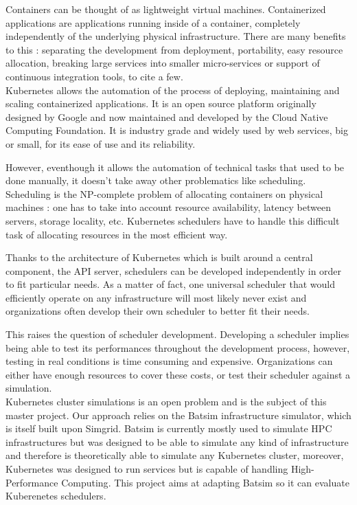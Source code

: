 \documentclass[12pt]{report}
\begin{document}
Containers can be thought of as lightweight virtual machines.  Containerized
applications are applications running inside of a container, completely
independently of the underlying physical infrastructure. There are many
benefits to this : separating the development from deployment,
portability, easy resource allocation, breaking large services into smaller
micro-services or support of continuous integration tools, to cite a few.\\

Kubernetes\cite{kubernetes} allows the automation of the process of deploying, maintaining and
scaling containerized applications. It is an open source platform originally
designed by Google and now maintained and developed by the Cloud Native
Computing Foundation. It is industry grade and widely used by web services, big
or small, for its ease of use and its reliability.

However, eventhough it allows the automation of technical tasks that used to be
done manually, it doesn't take away other problematics like scheduling.
Scheduling is the NP-complete problem of allocating containers on physical
machines : one has to take into account resource availability, latency between
servers, storage locality, etc. Kubernetes schedulers have to handle this
difficult task of allocating resources in the most efficient way.

Thanks to the architecture of Kubernetes which is built around a central
component, the API server, schedulers can be developed independently in order
to fit particular needs. As a matter of fact, one universal scheduler that
would efficiently operate on any infrastructure will most likely never exist
and organizations often develop their own scheduler to better fit their needs.

This raises the question of scheduler development. Developing a scheduler
implies being able to test its performances throughout the development process,
however, testing in real conditions is time consuming and expensive.
Organizations can either have enough resources to cover these costs, or test
their scheduler against a simulation.\\

Kubernetes cluster simulations is an open problem and is the subject of this
master project. Our approach relies on the Batsim\cite{batsim} infrastructure
simulator, which is itself built upon Simgrid\cite{simgrid}. Batsim is
currently mostly used to simulate HPC infrastructures but was designed to be
able to simulate any kind of infrastructure and therefore is theoretically able
to simulate any Kubernetes cluster, moreover, Kubernetes was designed to run
services but is capable of handling High-Performance
Computing\cite{kube-for-hpc}. This project aims at adapting Batsim so it can
evaluate Kuberenetes schedulers.
\end{document}
